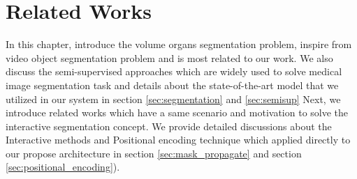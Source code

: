 \chapter{Related Works}
\label{chap-related-works}
\begin{ChapAbstract}
In this chapter, introduce the volume organs segmentation problem, inspire from video object segmentation problem and is most related to our work. We also discuss the semi-supervised approaches which are widely used to solve medical image segmentation task and details about the state-of-the-art model that we utilized in our system in section \ref{sec:segmentation} and \ref{sec:semisup} 
Next, we introduce related works which have a same scenario and motivation to solve the interactive segmentation concept. We provide detailed discussions about the Interactive methods and Positional encoding technique which applied directly to our propose architecture in section \ref{sec:mask_propagate} and section \ref{sec:positional_encoding}).
\end{ChapAbstract}
% 
% 
% 
% 





